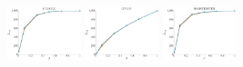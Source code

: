 \documentclass[a4paper]{report}
\newcommand{\wratio}{0.16}
\begin{document}
\vfill
\includegraphics[width=\wratio\textwidth]{influence/GOOGLE/fs_google}\hfill
\includegraphics[width=\wratio\textwidth]{influence/GPLUS/fs_gplus}\hfill
\includegraphics[width=\wratio\textwidth]{influence/HAMSTERSTER/fs_hamsterster}\hfill
\end{document}
